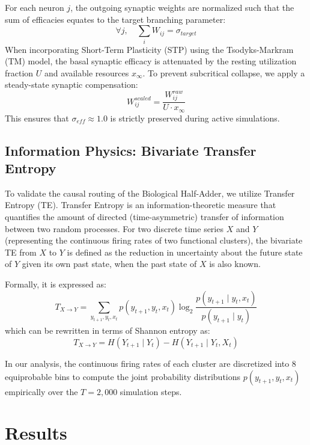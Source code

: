 \documentclass[12pt, a4paper]{article}
\begin{document}
For each neuron $j$, the outgoing synaptic weights are normalized such that the sum of efficacies equates to the target branching parameter:
\begin{equation}
\forall j, \quad \sum_{i} W_{ij} = \sigma_{target}
\end{equation}
When incorporating Short-Term Plasticity (STP) using the Tsodyks-Markram (TM) model, the basal synaptic efficacy is attenuated by the resting utilization fraction $U$ and available resources $x_{\infty}$. To prevent subcritical collapse, we apply a steady-state synaptic compensation:
\begin{equation}
W_{ij}^{scaled} = \frac{W_{ij}^{raw}}{U \cdot x_{\infty}}
\end{equation}
This ensures that $\sigma_{eff} \approx 1.0$ is strictly preserved during active simulations.

\subsection{Information Physics: Bivariate Transfer Entropy}

To validate the causal routing of the Biological Half-Adder, we utilize Transfer Entropy (TE). Transfer Entropy is an information-theoretic measure that quantifies the amount of directed (time-asymmetric) transfer of information between two random processes. For two discrete time series $X$ and $Y$ (representing the continuous firing rates of two functional clusters), the bivariate TE from $X$ to $Y$ is defined as the reduction in uncertainty about the future state of $Y$ given its own past state, when the past state of $X$ is also known.

Formally, it is expressed as:
\begin{equation}
T_{X \to Y} = \sum_{y_{t+1}, y_t, x_t} p(y_{t+1}, y_t, x_t) \log_2 \frac{p(y_{t+1} \mid y_t, x_t)}{p(y_{t+1} \mid y_t)}
\end{equation}
which can be rewritten in terms of Shannon entropy as:
\begin{equation}
T_{X \to Y} = H(Y_{t+1} \mid Y_t) - H(Y_{t+1} \mid Y_t, X_t)
\end{equation}

In our analysis, the continuous firing rates of each cluster are discretized into 8 equiprobable bins to compute the joint probability distributions $p(y_{t+1}, y_t, x_t)$ empirically over the $T = 2,000$ simulation steps.

\section{Results}
\end{document}
